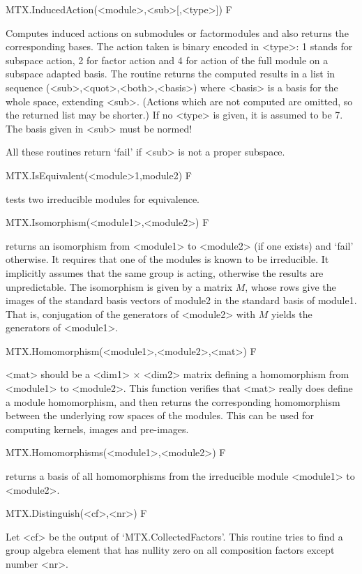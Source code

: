 \>MTX.InducedAction(<module>,<sub>[,<type>]) F

Computes induced actions on submodules or factormodules and also returns the
corresponding bases. The action taken is binary encoded in <type>:
1 stands for subspace action, 2 for
factor action and 4 for action of the full module
on a subspace adapted basis.
The routine returns the computed results in a list in sequence
(<sub>,<quot>,<both>,<basis>) where <basis> is a basis for the whole space,
extending <sub>. (Actions which are not computed are omitted, so the
returned list may be shorter.)
If no <type> is given, it is assumed to be 7.
The basis given in <sub> must be normed!

All these routines return `fail' if <sub> is not a proper subspace.


\>MTX.IsEquivalent(<module>1,module2) F

tests two irreducible modules for equivalence.

\>MTX.Isomorphism(<module1>,<module2>) F

returns an isomorphism from <module1> to <module2> (if one exists) and 
`fail' otherwise. It requires that one of the modules is known to be
irreducible. It implicitly assumes that the same group is acting, otherwise
the results are unpredictable.
The isomorphism is given by a matrix $M$, whose rows give the images of the
standard basis vectors of module2 in the standard basis of module1. That is,
conjugation of the generators of <module2> with $M$ yields the
generators of <module1>.

\>MTX.Homomorphism(<module1>,<module2>,<mat>) F

<mat> should be a <dim1> $\times$ <dim2> matrix defining a homomorphism
from <module1> to <module2>.  This function verifies that <mat>
really does define a module homomorphism, and then returns the
corresponding homomorphism between the underlying row spaces of the
modules. This can be used for computing kernels, images and pre-images.

\>MTX.Homomorphisms(<module1>,<module2>) F

returns a basis of all homomorphisms from the irreducible module 
<module1> to <module2>.

\>MTX.Distinguish(<cf>,<nr>) F

Let <cf> be the output of `MTX.CollectedFactors'. This routine
tries to find a group algebra element that has nullity zero on all
composition factors except number <nr>.


